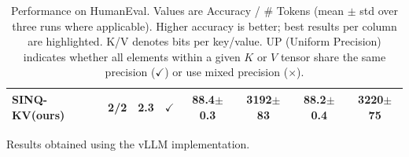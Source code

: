 \documentclass{llmxive}
\providecommand{\ours}[1]{\cellcolor{customblue!30}#1}
\providecommand{\methodname}{SINQ-KV\xspace}
\begin{document}
\begin{table}[t]
\begin{threeparttable}
\begin{tabular}{l l c c c c c c}
\textbf{\ours{\methodname (ours)}} 
& \ours{2/2} & \ours{2.3} & \ours{$\checkmark$}
& \ours{\textbf{88.4}\tiny$\pm$0.3} & \ours{\num{3192}\tiny$\pm$83}
& \ours{\textbf{88.2}\tiny$\pm$0.4} & \ours{\num{3220}\tiny$\pm$75} \\

\bottomrule
\bottomrule
\end{tabular}
\begin{tablenotes}
\item[1]Results obtained using the vLLM implementation.
\end{tablenotes}
\end{threeparttable}
\caption{Performance on HumanEval. Values are Accuracy / \# Tokens (mean $\pm$ std over three runs where applicable). Higher accuracy is better; best results per column are highlighted. K/V denotes bits per key/value. UP (Uniform Precision) indicates whether all elements within a given $K$ or $V$ tensor share the same precision ($\checkmark$) or use mixed precision ($\times$).}
\label{tab:humaneval_results}
\end{table}
\end{document}
